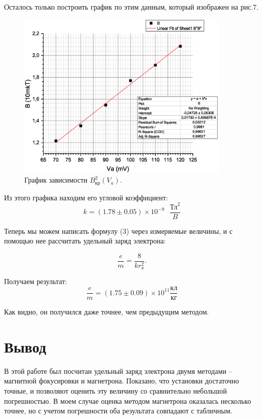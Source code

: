 \documentclass[a4paper, 14pt]{extarticle}%
\newcommand\ECaption[1]{%
     \captionsetup{font=footnotesize}%
     \caption{#1}}
\begin{document}
Осталось только построить график по этим данным, который изображен на рис.7.

\begin{figure}[h!]
\begin{center}
\includegraphics[width=0.9\textwidth]{grBV}
\end{center}
\ECaption{График зависимости $B^2_{\text{кр}}(V_a)$.}
\end{figure}
 
Из этого графика находим его угловой коэффициент:
\[k = (1.78\pm0.05)\times10^{-9}  \text{ } \dfrac{\text{Тл}^2}{B}\]
 
Теперь мы можем написать формулу (3) через измеряемые величины, и с помощью нее рассчитать удельный заряд электрона:

\begin{equation}
\dfrac{e}{m} = \dfrac{8}{kr^2_a}.
\end{equation}
 
Получаем результат:
\[\frac{e}{m} = (1.75\pm0.09)\times10^{11} \dfrac{\text{кл}}{\text{кг}}\]
 
Как видно, он получился даже точнее, чем предыдущим методом. 
\section*{Вывод}
 
В этой работе был посчитан удельный заряд электрона двумя методами -- магнитной фокусировки и магнетрона. Показано, что установки достаточно точные, и позволяют оценить эту величину со сравнительно небольшой погрешностью. В моем случае оценка методом магнетрона оказалась несколько точнее, но с учетом погрешности оба результата совпадают с табличным.


 
 
 
\end{document}
